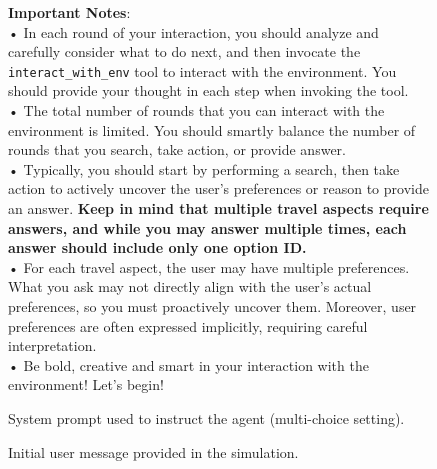 \begin{figure}[t]
{\begin{tcolorbox}[colback=blue!5!white, colframe=blue!75!black, 
title=System Prompt for Agent (Multi-Choice Setting), boxrule=0.3mm, width=\textwidth, arc=3mm, auto outer arc=true]
\textbf{Important Notes}:\\
  \quad• In each round of your interaction, you should analyze and carefully consider what to do next, and then invocate the \texttt{interact\_with\_env} tool to interact with the environment. You should provide your thought in each step when invoking the tool.\\
  \quad• The total number of rounds that you can interact with the environment is limited. You should smartly balance the number of rounds that you search, take action, or provide answer.\\
  \quad• Typically, you should start by performing a search, then take action to actively uncover the user's preferences or reason to provide an answer. \textbf{Keep in mind that multiple travel aspects require answers, and while you may answer multiple times, each answer should include only one option ID.}\\
  \quad• For each travel aspect, the user may have multiple preferences. What you ask may not directly align with the user's actual preferences, so you must proactively uncover them. Moreover, user preferences are often expressed implicitly, requiring careful interpretation.\\
  \quad• Be bold, creative and smart in your interaction with the environment! Let's begin!
\end{tcolorbox}
}
\caption{System prompt used to instruct the agent (multi-choice setting).}
\label{fig:system_prompt_2}
\end{figure}


\begin{figure}[t]
\centering
{}
\caption{Initial user message provided in the {\gymname} simulation.}
\label{fig:user_prompt}
\end{figure}
